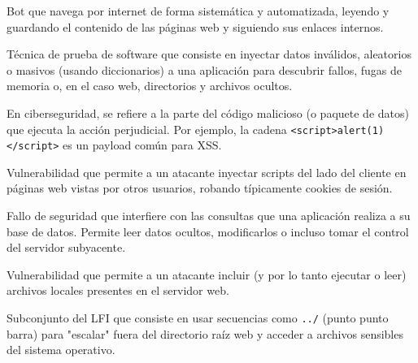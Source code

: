 \documentclass[12pt,letterpaper]{article}
\begin{document}
\begin{description}[leftmargin=!,labelwidth=\widthof{\bfseries Directory Traversal}]
    
    \item[\textbf{Crawler / Spider}] Bot que navega por internet de forma sistemática y automatizada, leyendo y guardando el contenido de las páginas web y siguiendo sus enlaces internos.
    
    \item[\textbf{Fuzzing}] Técnica de prueba de software que consiste en inyectar datos inválidos, aleatorios o masivos (usando diccionarios) a una aplicación para descubrir fallos, fugas de memoria o, en el caso web, directorios y archivos ocultos.
    
    \item[\textbf{Payload}] En ciberseguridad, se refiere a la parte del código malicioso (o paquete de datos) que ejecuta la acción perjudicial. Por ejemplo, la cadena \texttt{<script>alert(1)</script>} es un payload común para XSS.
    
    \item[\textbf{XSS (Cross-Site Scripting)}] Vulnerabilidad que permite a un atacante inyectar scripts del lado del cliente en páginas web vistas por otros usuarios, robando típicamente cookies de sesión.
    
    \item[\textbf{SQLi (SQL Injection)}] Fallo de seguridad que interfiere con las consultas que una aplicación realiza a su base de datos. Permite leer datos ocultos, modificarlos o incluso tomar el control del servidor subyacente.
    
    \item[\textbf{LFI (Local File Inclusion)}] Vulnerabilidad que permite a un atacante incluir (y por lo tanto ejecutar o leer) archivos locales presentes en el servidor web.
    
    \item[\textbf{Directory Traversal}] Subconjunto del LFI que consiste en usar secuencias como \texttt{../} (punto punto barra) para "escalar" fuera del directorio raíz web y acceder a archivos sensibles del sistema operativo.
    
\end{description}
\end{document}

